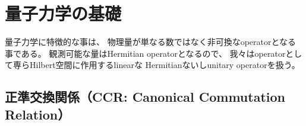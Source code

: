 \section{量子力学の基礎}

量子力学に特徴的な事は、
物理量が単なる数ではなく非可換なoperatorとなる事である。
観測可能な量はHermitian operatorとなるので、
我々はoperatorとして専らHilbert空間に作用するlinearな
Hermitianないしunitary operatorを扱う。

\subsection{正準交換関係（CCR: Canonical Commutation Relation）}

